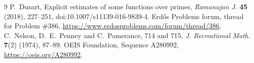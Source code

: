 \documentclass[11pt]{article}
\theoremstyle{definition}
\theoremstyle{remark}
\begin{document}
\begin{thebibliography}{9}
 P.~Dusart, Explicit estimates of some functions over primes,
  \emph{Ramanujan J.} \textbf{45} (2018), 227--251, doi:10.1007/s11139-016-9839-4.
 Erd\H{o}s Problems forum, thread for Problem \#386,
  \url{https://www.erdosproblems.com/forum/thread/386}.
 C.~Nelson, D.~E.~Penney and C.~Pomerance, 714 and 715,
  \emph{J. Recreational Math.} \textbf{7}(2) (1974), 87--89.
 OEIS Foundation, Sequence A280992, \url{https://oeis.org/A280992}.
\end{thebibliography}
\end{document}
